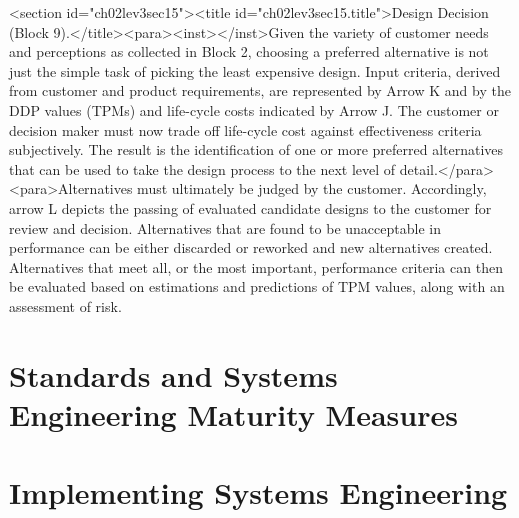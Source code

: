 <section id="ch02lev3sec15"><title id="ch02lev3sec15.title">Design Decision (Block 9).</title><para><inst></inst>Given the variety of customer needs and perceptions as collected in Block 2, choosing a preferred alternative is not just the simple task of picking the least expensive design. Input criteria, derived from customer and product requirements, are represented by Arrow K and by the DDP values (TPMs) and life-cycle costs indicated by Arrow J. The customer or decision maker must now trade off life-cycle cost against effectiveness criteria subjectively. The result is the identification of one or more preferred alternatives that can be used to take the design process to the next level of detail.</para>
<para>Alternatives must ultimately be judged by the customer. Accordingly, arrow L depicts the passing of evaluated candidate designs to the customer for review and decision. Alternatives that are found to be unacceptable in performance can be either discarded or reworked and new alternatives created. Alternatives that meet all, or the most important, performance criteria can then be evaluated based on estimations and predictions of TPM values, along with an assessment of risk.


\section{Standards and Systems Engineering Maturity Measures}


\section{Implementing Systems Engineering}

